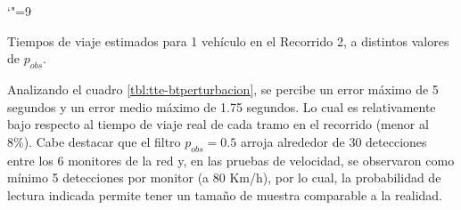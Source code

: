 \begin{table}
\centering
\begingroup\catcode`"=9
 \captionsetup{width=0.8\textwidth}
    \caption{Tiempos de viaje estimados para 1 vehículo en el Recorrido 2, a distintos valores de $p_{obs}$.}
    \label{tbl:tte-btperturbacion}
\endgroup
\end{table}

Analizando el cuadro \ref{tbl:tte-btperturbacion}, se percibe un error máximo de 5 segundos y un error medio máximo de 1.75 segundos. Lo cual es relativamente bajo respecto al tiempo de viaje real de cada tramo en el recorrido (menor al 8\%). Cabe destacar que el filtro $p_{obs}=0.5$ arroja alrededor de 30 detecciones entre los 6 monitores de la red y, en las pruebas de velocidad, se observaron como mínimo 5 detecciones por monitor (a 80 Km/h), por lo cual, la probabilidad de lectura indicada permite tener un tamaño de muestra comparable a la realidad.
\par 

